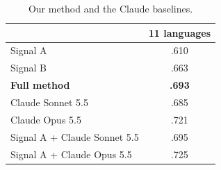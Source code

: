 \begin{table}[t]
\centering
\small
\setlength{\tabcolsep}{4pt}
\begin{tabular}{lc}
\toprule
 & 11 languages \\
\midrule
Signal A                      & .610 \\ %
Signal B                      & .663 \\ %
\midrule
\textbf{Full method}          & \textbf{.693} \\ %
\midrule
Claude Sonnet 5.5             & .685 \\ %
Claude Opus 5.5               & .721 \\ %
\midrule
Signal A + Claude Sonnet 5.5  & .695 \\ %
Signal A + Claude Opus 5.5    & .725 \\ %
\bottomrule
\end{tabular}
\caption{Our method and the Claude baselines.}
\label{tab:ablations}
\end{table}

